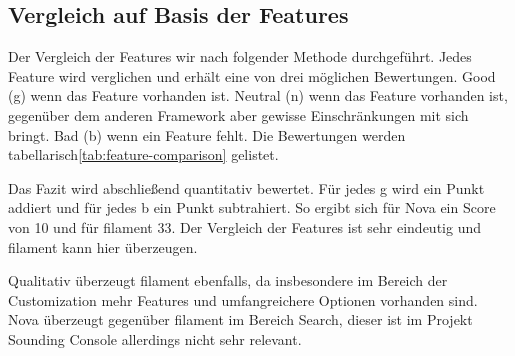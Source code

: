 \subsection{Vergleich auf Basis der Features}
Der Vergleich der Features wir nach folgender Methode durchgeführt.
Jedes Feature wird verglichen und erhält eine von drei möglichen Bewertungen.
Good (g) wenn das Feature vorhanden ist.
Neutral (n) wenn das Feature vorhanden ist, gegenüber dem anderen Framework aber gewisse Einschränkungen mit sich bringt.
Bad (b) wenn ein Feature fehlt.
Die Bewertungen werden tabellarisch\ref{tab:feature-comparison} gelistet.

Das Fazit wird abschließend quantitativ bewertet.
Für jedes g wird ein Punkt addiert und für jedes b ein Punkt subtrahiert.
So ergibt sich für Nova ein Score von 10 und für filament 33.
Der Vergleich der Features ist sehr eindeutig und filament kann hier überzeugen.

Qualitativ überzeugt filament ebenfalls, da insbesondere im Bereich der Customization mehr Features und umfangreichere Optionen vorhanden sind.
Nova überzeugt gegenüber filament im Bereich Search, dieser ist im Projekt Sounding Console allerdings nicht sehr relevant.


